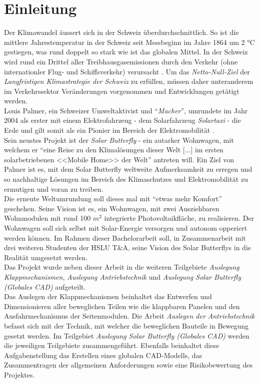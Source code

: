 \section{Einleitung}
Der Klimawandel äussert sich in der Schweiz überdurchschnittlich. So ist die mittlere Jahrestemperatur in der Schweiz seit Messbeginn im Jahre 1864 um 2 °C gestiegen, was rund doppelt so stark wie ist das globalen Mittel. In der Schweiz wird rund ein Drittel aller Treibhausgasemissionen durch den Verkehr (ohne internationler Flug- und Schiffsverkehr) verursacht \cite{BAFU}. Um das \emph{Netto-Null-Ziel} der \emph{Langfristigen Klimastrategie der Schweiz} zu erfüllen, müssen daher unteranderem im Verkehrssektor Veränderungen vorgenommen und Entwicklungen getätigt werden.\\
Louis Palmer, ein Schweizer Umweltaktivist und ``\emph{Macher}'', umrundete im Jahr 2004 als erster mit einem Elektrofahrzeug - dem Solarfahrzeug \emph{Solartaxi} - die Erde und gilt somit als ein Pionier im Bereich der Elektromobilität \cite{Palmer}.\\
Sein neustes Projekt ist der \emph{Solar Butterfly} - ein autarker Wohnwagen, mit welchem er ``eine Reise zu den Klimalösungen dieser Welt [...] im ersten solarbetriebenen <<Mobile Home>> der Welt'' antreten will. Ein Ziel von Palmer ist es, mit dem Solar Butterfly weltweite Aufmerksamkeit zu erregen und so nachhaltige Lösungen im Bereich des Klimaschutzes und Elektromobilität zu ermutigen und voran zu treiben.\\
Die erneute Weltumrundung soll dieses mal mit ``etwas mehr Komfort'' geschehen. Seine Vision ist es, ein Wohnwagen, mit zwei Ausziehbaren Wohnmodulen mit rund 100 $m^2$ integrierte Photovoltaikfläche, zu realisieren. Der Wohnwagen soll sich selbst mit Solar-Energie versorgen und autonom opperiert werden können. Im Rahmen dieser Bachelorarbeit soll, in Zusammenarbeit mit drei weiteren Studenten der HSLU T\&A, seine Vision des Solar Butterflys in die Realität umgesetzt werden.\\
Das Projekt wurde neben dieser Arbeit in die weiteren Teilgebiete \emph{Auslegung Klappmechanismen}, \emph{Auslegung Antriebstechnik} und \emph{Auslegung Solar Butterfly (Globales CAD)} aufgeteilt.\\
Das Auslegen der Klappmechanismen beinhaltet das Entwerfen und Dimensionieren aller beweglichen Teilen wie die klappbaren Panelen und den Ausfahrmechanismus der Seitenmodulen. Die Arbeit \emph{Auslegen der Antriebstechnik} befasst sich mit der Technik, mit welcher die beweglichen Bauteile in Bewegung gesetzt werden. Im Teilgebiet \emph{Auslegung Solar Butterfly (Globales CAD)} werden die jeweiligen Teilgebiete zusammengeführt. Ebenfalls beinhaltet diese Aufgabenstellung das Erstellen eines globalen CAD-Modells, das Zusammentragen der allgemeinen Anforderungen sowie eine Risikobewertung des Projektes.\\

